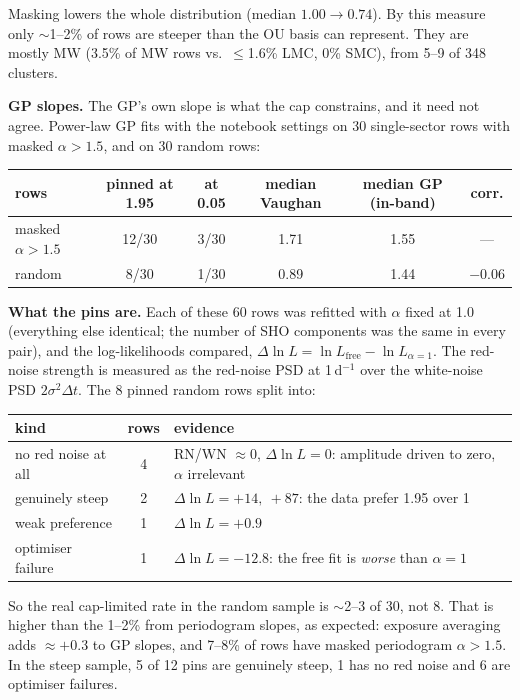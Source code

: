 \documentclass[11pt]{article}
\begin{document}
Masking lowers the whole distribution (median $1.00\to0.74$). By this measure only
$\sim$1--2\% of rows are steeper than the OU basis can represent. They are mostly MW
(3.5\% of MW rows vs.\ $\le$1.6\% LMC, 0\% SMC), from 5--9 of 348 clusters.

\textbf{GP slopes.} The GP's own slope is what the cap constrains, and it need not agree.
Power-law GP fits with the notebook settings on 30 single-sector rows with masked
$\alpha>1.5$, and on 30 random rows:

\begin{center}
\begin{tabular}{lccccc}
\toprule
rows & pinned at 1.95 & at 0.05 & median Vaughan & median GP (in-band) & corr. \\
\midrule
masked $\alpha>1.5$ & 12/30 & 3/30 & 1.71 & 1.55 & --- \\
random             & 8/30  & 1/30 & 0.89 & 1.44 & $-0.06$ \\
\bottomrule
\end{tabular}
\end{center}

\textbf{What the pins are.} Each of these 60 rows was refitted with $\alpha$ fixed at 1.0
(everything else identical; the number of SHO components was the same in every pair), and
the log-likelihoods compared, $\Delta\ln L = \ln L_\mathrm{free} - \ln L_{\alpha=1}$. The
red-noise strength is measured as the red-noise PSD at 1\,d$^{-1}$ over the white-noise
PSD $2\sigma^2\Delta t$. The 8 pinned random rows split into:

\begin{center}
\begin{tabular}{lcl}
\toprule
kind & rows & evidence \\
\midrule
no red noise at all       & 4 & RN/WN $\approx 0$, $\Delta\ln L = 0$: amplitude driven to zero, $\alpha$ irrelevant \\
genuinely steep           & 2 & $\Delta\ln L = +14,\ +87$: the data prefer 1.95 over 1 \\
weak preference           & 1 & $\Delta\ln L = +0.9$ \\
optimiser failure         & 1 & $\Delta\ln L = -12.8$: the free fit is \emph{worse} than $\alpha=1$ \\
\bottomrule
\end{tabular}
\end{center}

So the real cap-limited rate in the random sample is $\sim$2--3 of 30, not 8. That is
higher than the 1--2\% from periodogram slopes, as expected: exposure averaging adds
$\approx+0.3$ to GP slopes, and 7--8\% of rows have masked periodogram $\alpha > 1.5$.
In the steep sample, 5 of 12 pins are genuinely steep, 1 has no red noise and 6 are
optimiser failures.
\end{document}
